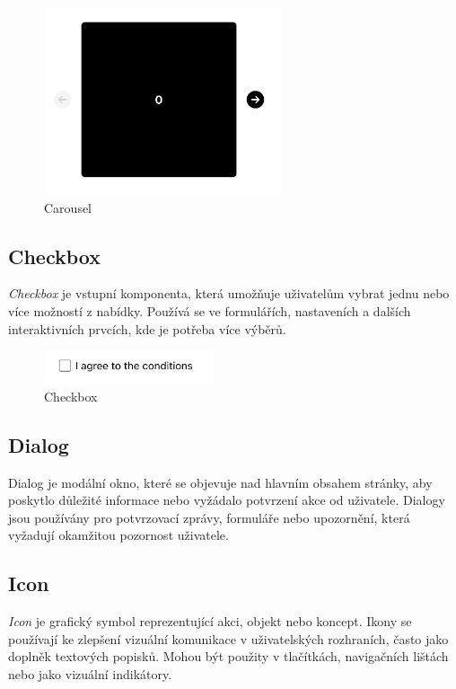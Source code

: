 \begin{figure}[H]
  \centering
  \includegraphics[width=7cm]{images/carousel}
  \captionsetup{justification=centering,margin=2cm}
  \caption{Carousel} \label{picture:carousel}
\end{figure}

\subsection{Checkbox}
\emph{Checkbox} je vstupní komponenta, která umožňuje uživatelům vybrat jednu nebo více možností z nabídky. Používá se ve formulářích, nastaveních a dalších interaktivních prvcích, kde je potřeba více výběrů.

\begin{figure}[H]
  \centering
  \includegraphics[width=5cm]{images/checkbox}
  \captionsetup{justification=centering,margin=2cm}
  \caption{Checkbox} \label{picture:checkbox}
\end{figure}

\subsection{Dialog}
Dialog je modální okno, které se objevuje nad hlavním obsahem stránky, aby poskytlo důležité informace nebo vyžádalo potvrzení akce od uživatele. Dialogy jsou používány pro potvrzovací zprávy, formuláře nebo upozornění, která vyžadují okamžitou pozornost uživatele.

\subsection{Icon}
\emph{Icon} je grafický symbol reprezentující akci, objekt nebo koncept. Ikony se používají ke zlepšení vizuální komunikace v uživatelských rozhraních, často jako doplněk textových popisků. Mohou být použity v tlačítkách, navigačních lištách nebo jako vizuální indikátory.

